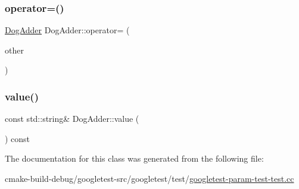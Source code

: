 \mbox{\label{classDogAdder_a13bd773069c15b083f876b8afd512247}} 
\subsubsection{\texorpdfstring{operator=()}{operator=()}}
{\footnotesize\ttfamily \mbox{\hyperlink{classDogAdder}{Dog\+Adder}} Dog\+Adder\+::operator= (\begin{DoxyParamCaption}\item[{const \mbox{\hyperlink{classDogAdder}{Dog\+Adder}} \&}]{other }\end{DoxyParamCaption})\hspace{0.3cm}{\ttfamily [inline]}}

\mbox{\label{classDogAdder_a76bb9e42f79e9d4adacd9e48a3a3c9fb}} 
\subsubsection{\texorpdfstring{value()}{value()}}
{\footnotesize\ttfamily const std\+::string\& Dog\+Adder\+::value (\begin{DoxyParamCaption}{ }\end{DoxyParamCaption}) const\hspace{0.3cm}{\ttfamily [inline]}}



The documentation for this class was generated from the following file\+:\begin{DoxyCompactItemize}
\item 
cmake-\/build-\/debug/googletest-\/src/googletest/test/\mbox{\hyperlink{googletest-param-test-test_8cc}{googletest-\/param-\/test-\/test.\+cc}}\end{DoxyCompactItemize}

